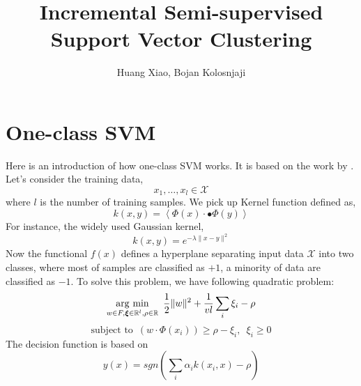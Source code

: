 \documentclass{llncs}
\newcommand{\vct}[1]{\ensuremath{\boldsymbol{#1}}} %
\newcommand{\argmin}{\operatornamewithlimits{\arg\,\min}}
\begin{document}
	
	\title{Incremental Semi-supervised Support Vector Clustering}
	
	\author{Huang Xiao, Bojan Kolosnjaji}
	
	\maketitle              %
	
	\begin{abstract}
		
		
	\end{abstract}
	\section{One-class SVM}
	Here is an introduction of how one-class SVM works. It is based on the work by \cite{schoekopf99}.
	Let's consider the training data,
	\begin{equation}
		x_1,\ldots , x_l \in \mathcal{X}
	\end{equation}
	where $l$ is the number of training samples. We pick up Kernel function defined as,
	\begin{equation}
		k\left(x, y\right)=\left\langle\Phi\left(x\right)\cdot{•}\Phi\left(y\right)\right\rangle
	\end{equation}
	For instance, the widely used Gaussian kernel,
	\begin{equation}
		k\left(x,y\right) = e^{-\lambda\|x-y\|^2}
	\end{equation}
	Now the functional $f\left(x\right)$ defines a hyperplane separating input data $\mathcal{X}$ into two classes, where most of samples
	are classified as $+1$, a minority of data are classified as $-1$. To solve this problem, we have following quadratic problem:
	\begin{equation}
		\underset{w \in F, \vct{\xi} \in \mathbb{R}^l, \rho \in \mathbb{R}}{\argmin}  \,\,\, \frac{1}{2}\|w\|^2+\frac{1}{vl}\sum_i\xi_i-\rho
	\end{equation}
	\begin{equation}
		\text{subject to}\,\,\, \left(w\cdot\Phi\left(x_i\right)\right)\geq \rho - \xi_i, \,\,\, \xi_i \geq 0
	\end{equation}
	The decision function is based on 
	\begin{equation}
		y\left(x\right)=sgn\left( \sum_i\alpha_i k\left(x_i,x\right) - \rho\right)
	\end{equation}
\end{document}
